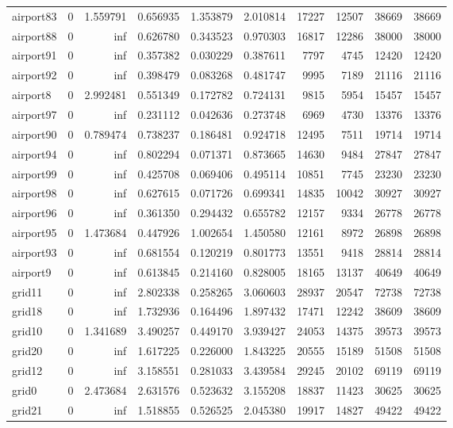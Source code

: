 \begin{longtable}{|l|r|r|r|r|r|r|r|r|r|}
airport83 & 0 & 1.559791 & 0.656935 & 1.353879 & 2.010814 & 17227 & 12507 & 38669 & 38669 \\
airport88 & 0 & inf & 0.626780 & 0.343523 & 0.970303 & 16817 & 12286 & 38000 & 38000 \\
airport91 & 0 & inf & 0.357382 & 0.030229 & 0.387611 & 7797 & 4745 & 12420 & 12420 \\
airport92 & 0 & inf & 0.398479 & 0.083268 & 0.481747 & 9995 & 7189 & 21116 & 21116 \\
airport8 & 0 & 2.992481 & 0.551349 & 0.172782 & 0.724131 & 9815 & 5954 & 15457 & 15457 \\
airport97 & 0 & inf & 0.231112 & 0.042636 & 0.273748 & 6969 & 4730 & 13376 & 13376 \\
airport90 & 0 & 0.789474 & 0.738237 & 0.186481 & 0.924718 & 12495 & 7511 & 19714 & 19714 \\
airport94 & 0 & inf & 0.802294 & 0.071371 & 0.873665 & 14630 & 9484 & 27847 & 27847 \\
airport99 & 0 & inf & 0.425708 & 0.069406 & 0.495114 & 10851 & 7745 & 23230 & 23230 \\
airport98 & 0 & inf & 0.627615 & 0.071726 & 0.699341 & 14835 & 10042 & 30927 & 30927 \\
airport96 & 0 & inf & 0.361350 & 0.294432 & 0.655782 & 12157 & 9334 & 26778 & 26778 \\
airport95 & 0 & 1.473684 & 0.447926 & 1.002654 & 1.450580 & 12161 & 8972 & 26898 & 26898 \\
airport93 & 0 & inf & 0.681554 & 0.120219 & 0.801773 & 13551 & 9418 & 28814 & 28814 \\
airport9 & 0 & inf & 0.613845 & 0.214160 & 0.828005 & 18165 & 13137 & 40649 & 40649 \\
grid11 & 0 & inf & 2.802338 & 0.258265 & 3.060603 & 28937 & 20547 & 72738 & 72738 \\
grid18 & 0 & inf & 1.732936 & 0.164496 & 1.897432 & 17471 & 12242 & 38609 & 38609 \\
grid10 & 0 & 1.341689 & 3.490257 & 0.449170 & 3.939427 & 24053 & 14375 & 39573 & 39573 \\
grid20 & 0 & inf & 1.617225 & 0.226000 & 1.843225 & 20555 & 15189 & 51508 & 51508 \\
grid12 & 0 & inf & 3.158551 & 0.281033 & 3.439584 & 29245 & 20102 & 69119 & 69119 \\
grid0 & 0 & 2.473684 & 2.631576 & 0.523632 & 3.155208 & 18837 & 11423 & 30625 & 30625 \\
grid21 & 0 & inf & 1.518855 & 0.526525 & 2.045380 & 19917 & 14827 & 49422 & 49422 \\

\end{longtable}

